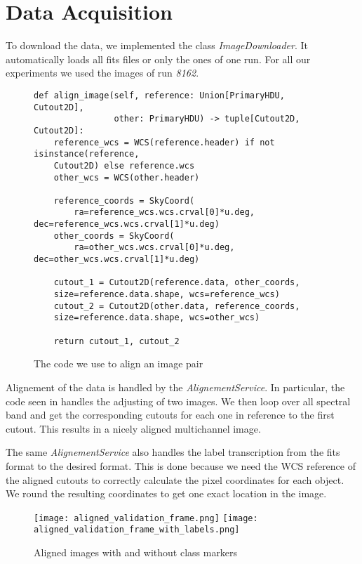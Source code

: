 \section{Data Acquisition}
To download the data, we implemented the class \emph{ImageDownloader}. It automatically loads all fits files or only the ones of one run.
For all our experiments we used the images of run \emph{8162}.

\begin{figure}
    \begin{verbatim}
def align_image(self, reference: Union[PrimaryHDU, Cutout2D],
                other: PrimaryHDU) -> tuple[Cutout2D, Cutout2D]:
    reference_wcs = WCS(reference.header) if not isinstance(reference,
    Cutout2D) else reference.wcs
    other_wcs = WCS(other.header)

    reference_coords = SkyCoord(
        ra=reference_wcs.wcs.crval[0]*u.deg, dec=reference_wcs.wcs.crval[1]*u.deg)
    other_coords = SkyCoord(
        ra=other_wcs.wcs.crval[0]*u.deg, dec=other_wcs.wcs.crval[1]*u.deg)
            
    cutout_1 = Cutout2D(reference.data, other_coords,
    size=reference.data.shape, wcs=reference_wcs)
    cutout_2 = Cutout2D(other.data, reference_coords,
    size=reference.data.shape, wcs=other_wcs)
            
    return cutout_1, cutout_2
        \end{verbatim}
    \label{alignementCode}
    \caption{The code we use to align an image pair}
\end{figure}

Alignement of the data is handled by the \emph{AlignementService}. In particular, the code seen in  handles the adjusting of two images. We then loop over all spectral band and get the corresponding cutouts for each one in reference to the first cutout. This results in a nicely aligned multichannel image.

The same \emph{AlignementService} also handles the label transcription from the fits format to the desired format. This is done because we need the WCS reference of the aligned cutouts to correctly calculate the pixel coordinates for each object.
We round the resulting coordinates to get one exact location in the image.

\begin{figure}
    \texttt{[image: aligned\_validation\_frame.png]}
    \texttt{[image: aligned\_validation\_frame\_with\_labels.png]}
    \caption{Aligned images with and without class markers}
    \label{alignedImages}
\end{figure}

